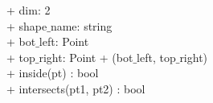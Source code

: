 {
+ dim: 2 \\
+ shape$\_$name: string\\
+ bot$\_$left: Point \\
+ top$\_$right: Point
}
{
+ \dunder (bot$\_$left, top$\_$right) \\
+ inside(pt) : bool \\
+ intersects(pt1, pt2) : bool
}
